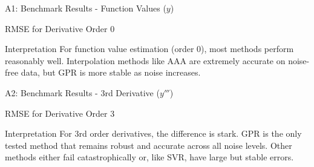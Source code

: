 \documentclass[aspectratio=169]{beamer}
\begin{document}
\begin{frame}{A1: Benchmark Results - Function Values ($y$)}
    \tiny
    \begin{block}{RMSE for Derivative Order 0}
        \centering
        
    \end{block}
    \begin{alertblock}{Interpretation}
        For function value estimation (order 0), most methods perform reasonably well. Interpolation methods like AAA are extremely accurate on noise-free data, but GPR is more stable as noise increases.
    \end{alertblock}
\end{frame}

\begin{frame}{A2: Benchmark Results - 3rd Derivative ($y'''$)}
    \tiny
    \begin{block}{RMSE for Derivative Order 3}
        \centering
        
    \end{block}
    \begin{alertblock}{Interpretation}
        For 3rd order derivatives, the difference is stark. GPR is the only tested method that remains robust and accurate across all noise levels. Other methods either fail catastrophically or, like SVR, have large but stable errors.
    \end{alertblock}
\end{frame}
\end{document}
